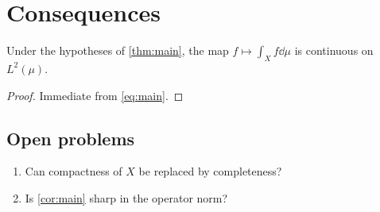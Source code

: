 
\section{Consequences}
\label{sec:conclusion}

\begin{corollary}
\label{cor:main}
Under the hypotheses of \cref{thm:main}, the map
$f \mapsto \int_X f \dd\mu$ is continuous on $L^2(\mu)$.
\end{corollary}

\begin{proof}
Immediate from \cref{eq:main}.
\end{proof}

\subsection*{Open problems}

\begin{enumerate}
  \item Can compactness of $X$ be replaced by completeness?
  \item Is \cref{cor:main} sharp in the operator norm?
\end{enumerate}
